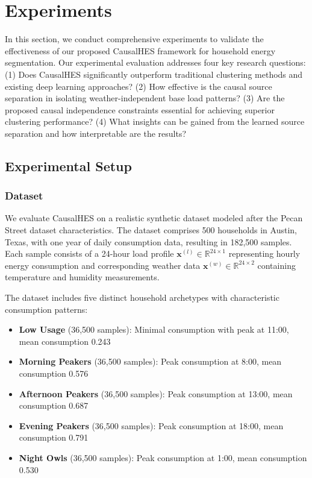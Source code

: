 \documentclass[journal]{IEEEtran}
\begin{document}
\section{Experiments}
In this section, we conduct comprehensive experiments to validate the effectiveness of our proposed CausalHES framework for household energy segmentation. Our experimental evaluation addresses four key research questions: (1) Does CausalHES significantly outperform traditional clustering methods and existing deep learning approaches? (2) How effective is the causal source separation in isolating weather-independent base load patterns? (3) Are the proposed causal independence constraints essential for achieving superior clustering performance? (4) What insights can be gained from the learned source separation and how interpretable are the results?

\subsection{Experimental Setup}

\subsubsection{Dataset}
We evaluate CausalHES on a realistic synthetic dataset modeled after the Pecan Street dataset characteristics. The dataset comprises 500 households in Austin, Texas, with one year of daily consumption data, resulting in 182,500 samples. Each sample consists of a 24-hour load profile $\mathbf{x}^{(l)} \in \mathbb{R}^{24 \times 1}$ representing hourly energy consumption and corresponding weather data $\mathbf{x}^{(w)} \in \mathbb{R}^{24 \times 2}$ containing temperature and humidity measurements.

The dataset includes five distinct household archetypes with characteristic consumption patterns:
\begin{itemize}
    \item \textbf{Low Usage} (36,500 samples): Minimal consumption with peak at 11:00, mean consumption 0.243
    \item \textbf{Morning Peakers} (36,500 samples): Peak consumption at 8:00, mean consumption 0.576
    \item \textbf{Afternoon Peakers} (36,500 samples): Peak consumption at 13:00, mean consumption 0.687
    \item \textbf{Evening Peakers} (36,500 samples): Peak consumption at 18:00, mean consumption 0.791
    \item \textbf{Night Owls} (36,500 samples): Peak consumption at 1:00, mean consumption 0.530
\end{itemize}
\end{document}
